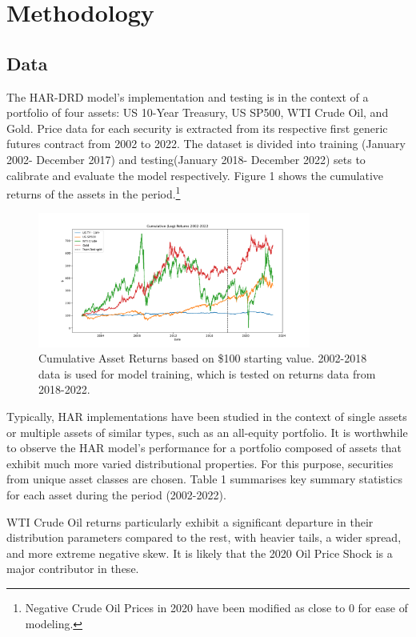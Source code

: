 \documentclass{article}
\begin{document}
\section{Methodology}
\subsection{Data}
The HAR-DRD model's implementation and testing is in the context of a portfolio of four assets: US 10-Year Treasury, US SP500, WTI Crude Oil, and Gold. 
Price data for each security is extracted from its respective first generic futures contract from 2002 to 2022. The dataset is divided into 
training (January 2002- December 2017) and testing(January 2018- December 2022) sets to calibrate and evaluate the model respectively. Figure 1 shows the cumulative 
returns of the assets in the period.\footnote{Negative Crude Oil Prices in 2020 have been modified as close to 0 for ease of modeling.}

\begin{figure}[ht]
    \centering
    \includegraphics[width=0.8\textwidth]{"Figures/Cumulative Asset Returns.png"} 
    \captionsetup{width=0.7\textwidth,justification=centering}
    \caption{Cumulative Asset Returns based on \$100 starting value. 2002-2018 data is
    used for model training, which is tested on returns data from 2018-2022.}
    \label{fig:my_image}
\end{figure}


Typically, HAR implementations have been studied in the context of
single assets or multiple assets of similar types, such as an all-equity portfolio. It is worthwhile to observe the HAR model's performance
for a portfolio composed of assets that exhibit much more varied distributional properties. For this purpose, securities from unique asset classes are chosen.
Table 1 summarises key summary statistics for each asset during the period (2002-2022).

WTI Crude Oil returns particularly exhibit a significant departure in their distribution parameters compared to
the rest, with heavier tails, a wider spread,  and more extreme negative skew. It is likely that the 2020 Oil Price Shock is a major
contributor in these.
\end{document}
